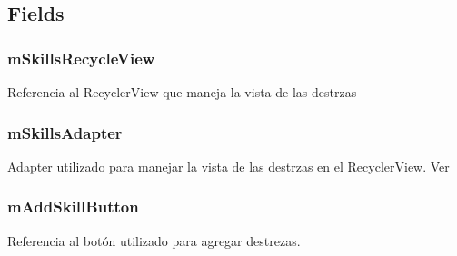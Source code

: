 \documentclass[letterpaper,10pt,english]{sphinxmanual}
\begin{document}
\subsection{Fields}
\label{Fragments/SkillsFragment:fields}

\subsubsection{mSkillsRecycleView}
\label{Fragments/SkillsFragment:mskillsrecycleview}

\begin{fulllineitems}
\label{Fragments/SkillsFragment:com.fiuba.tallerii.jobify.SkillsFragment.mSkillsRecycleView}
Referencia al RecyclerView que maneja la vista de las destrzas

\end{fulllineitems}



\subsubsection{mSkillsAdapter}
\label{Fragments/SkillsFragment:mskillsadapter}

\begin{fulllineitems}
\label{Fragments/SkillsFragment:com.fiuba.tallerii.jobify.SkillsFragment.mSkillsAdapter}
Adapter utilizado para manejar la vista de las destrzas en el RecyclerView. Ver 

\end{fulllineitems}



\subsubsection{mAddSkillButton}
\label{Fragments/SkillsFragment:maddskillbutton}

\begin{fulllineitems}
\label{Fragments/SkillsFragment:com.fiuba.tallerii.jobify.SkillsFragment.mAddSkillButton}
Referencia al botón utilizado para agregar destrezas.

\end{fulllineitems}
\end{document}
